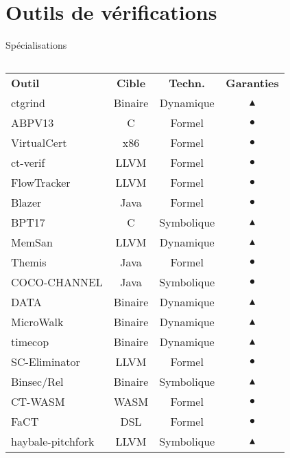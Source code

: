 \documentclass{backend/backend}
\begin{document}
{\section{Outils de vérifications}
\begin{frame}{Spécialisations}
    \begin{columns}%
    \tiny
    \begin{tabular}{lccc}
        \toprule
        \textbf{Outil} & \textbf{Cible} & \textbf{Techn.} & \textbf{Garanties} \\
        \rowcolor{lightgray}
        ctgrind \cite{ctgrind} & Binaire & Dynamique & $\blacktriangle$ \\
        ABPV13 \cite{ABPV13} & C & Formel & $\bullet$ \\
        \rowcolor{lightgray}
        VirtualCert \cite{VirtualCert} & x86 & Formel & $\bullet$ \\
        ct-verif \cite{ctverif} & LLVM & Formel & $\bullet$ \\
        \rowcolor{lightgray}
        FlowTracker \cite{FlowTracker} & LLVM & Formel & $\bullet$ \\
        Blazer \cite{Blazer} & Java & Formel & $\bullet$ \\
        \rowcolor{lightgray}
        BPT17 \cite{BPT17} & C & Symbolique & $\blacktriangle$ \\
        MemSan \cite{MemSan} & LLVM & Dynamique & $\blacktriangle$ \\
        \rowcolor{lightgray}
        Themis \cite{Themis} & Java & Formel & $\bullet$ \\
        COCO-CHANNEL \cite{COCOCHANNEL} & Java & Symbolique & $\bullet$ \\
        \rowcolor{lightgray}
        DATA \cite{DATA1,DATA2} & Binaire & Dynamique & $\blacktriangle$ \\
        MicroWalk \cite{MicroWalk} & Binaire & Dynamique & $\blacktriangle$ \\
        \rowcolor{lightgray}
        timecop \cite{timecop} & Binaire & Dynamique & $\blacktriangle$ \\
        SC-Eliminator \cite{SCEliminator} & LLVM & Formel & $\bullet$ \\
        \rowcolor{lightgray}
        Binsec/Rel \cite{binsecRel2019} & Binaire & Symbolique & $\blacktriangle$ \\
        CT-WASM \cite{CTWASM} & WASM & Formel & $\bullet$ \\
        \rowcolor{lightgray}
        FaCT \cite{FaCT} & DSL & Formel & $\bullet$ \\
        haybale-pitchfork \cite{haybale-pitchfork} & LLVM & Symbolique & $\blacktriangle$ \\
        \bottomrule
    \end{tabular}


\end{columns}
\end{frame}}
\end{document}
